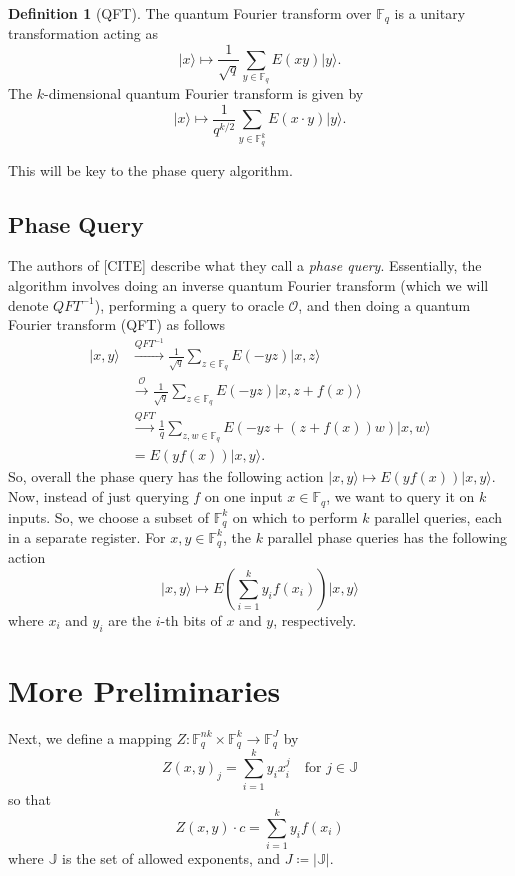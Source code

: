 \documentclass[12pt,twoside]{reedthesis}
\theoremstyle{definition}
\newtheorem{definition}[theorem]{Definition}
\newcommand{\F}{\mathbb{F}}
\newcommand{\ket}[1]{\ensuremath{\lvert #1\rangle}\xspace}
\begin{document}
\begin{definition}[QFT] The quantum Fourier transform over $\F_q$ is a unitary transformation acting as 
\begin{equation*}
\ket{x} \longmapsto \frac{1}{\sqrt{q}} \sum_{y \in \F_q} E(xy) \ket{y}.
\end{equation*}
The $k$-dimensional quantum Fourier transform is given by
\begin{equation*}
\ket{x} \longmapsto \frac{1}{q^{k/2}} \sum_{y\in \F_q^k} E(x \cdot y) \ket{y}.
\end{equation*}
\end{definition}
This will be key to the phase query algorithm.
\subsection{Phase Query}
The authors of [CITE] describe what they call a \textit{phase query}. Essentially, the algorithm involves doing an inverse quantum Fourier transform (which we will denote $QFT^{-1}$), performing a query to oracle $\mathcal{O}$, and then doing a quantum Fourier transform (QFT) as follows
\begin{align}
\ket{x,y} 
& \xrightarrow{QFT^{-1}} \frac{1}{\sqrt{q}} \sum_{z\in \F_q} E(-yz) \ket{x,z} \\
& \xrightarrow{\mathcal{O}} \frac{1}{\sqrt{q}} \sum_{z \in \F_q} E(-yz) \ket{x, z + f(x)} \\
& \xrightarrow{QFT} \frac{1}{q} \sum_{z,w \in \F_q} E(-yz + (z + f(x))w) \ket{x,w} \\
& = E(yf(x)) \ket{x,y}.
\end{align}
So, overall the phase query has the following action $\ket{x,y} \mapsto E(yf(x)) \ket{x,y}$. Now, instead of just querying $f$ on one input $x \in \F_q$, we want to query it on $k$ inputs. So, we choose a subset of $\F_q^k$ on which to perform $k$ parallel queries, each in a separate register. For $x,y \in \F_q^k$, the $k$ parallel phase queries has the following action
\begin{equation*}
\ket{x,y} \longmapsto E\left(\sum_{i=1}^{k} y_i f(x_i) \right) \ket{x,y}
\end{equation*}
where $x_i$ and $y_i$ are the $i$-th bits of $x$ and $y$, respectively.
\section{More Preliminaries}
Next, we define a mapping $Z: \F_q^{nk} \times \F_q^{k} \rightarrow \F_q^{J}$ by 
\begin{equation*}
Z(x,y)_j = \sum_{i = 1}^k y_ix_i^j \quad \text{for }j \in \mathbb{J}
\end{equation*}
so that
\begin{equation*}
Z(x,y) \cdot c = \sum_{i=1}^k y_i f(x_i)
\end{equation*}
where $\mathbb{J}$ is the set of allowed exponents, and $J \coloneqq \lvert \mathbb{J} \rvert$.
\end{document}
